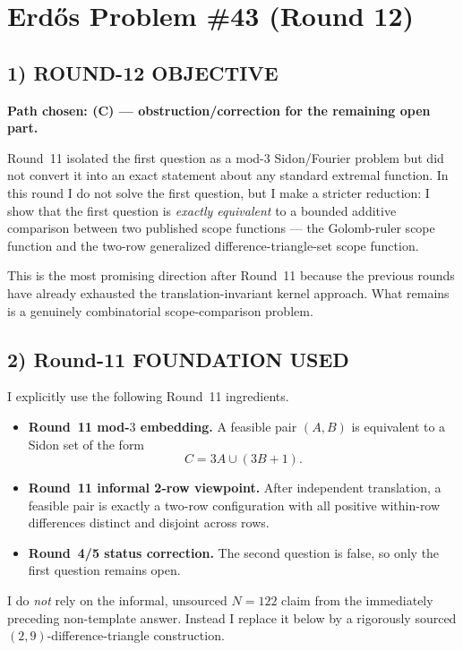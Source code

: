 \section{Erd\H{o}s Problem \#43 (Round 12)}

\subsection{1) ROUND-12 OBJECTIVE}

\textbf{Path chosen: (C) --- obstruction/correction for the remaining open part.}

Round~11 isolated the first question as a mod-$3$ Sidon/Fourier problem but did not convert it into an exact statement about any standard extremal function. In this round I do not solve the first question, but I make a stricter reduction: I show that the first question is \emph{exactly equivalent} to a bounded additive comparison between two published scope functions --- the Golomb-ruler scope function and the two-row generalized difference-triangle-set scope function.

This is the most promising direction after Round~11 because the previous rounds have already exhausted the translation-invariant kernel approach. What remains is a genuinely combinatorial scope-comparison problem.

\subsection{2) Round-11 FOUNDATION USED}

I explicitly use the following Round~11 ingredients.
\begin{itemize}
\item \textbf{Round~11 mod-$3$ embedding.} A feasible pair $(A,B)$ is equivalent to a Sidon set of the form
\[
C=3A\cup(3B+1).
\]
\item \textbf{Round~11 informal 2-row viewpoint.} After independent translation, a feasible pair is exactly a two-row configuration with all positive within-row differences distinct and disjoint across rows.
\item \textbf{Round~4/5 status correction.} The second question is false, so only the first question remains open.
\end{itemize}

I do \emph{not} rely on the informal, unsourced $N=122$ claim from the immediately preceding non-template answer. Instead I replace it below by a rigorously sourced $(2,9)$-difference-triangle construction.

